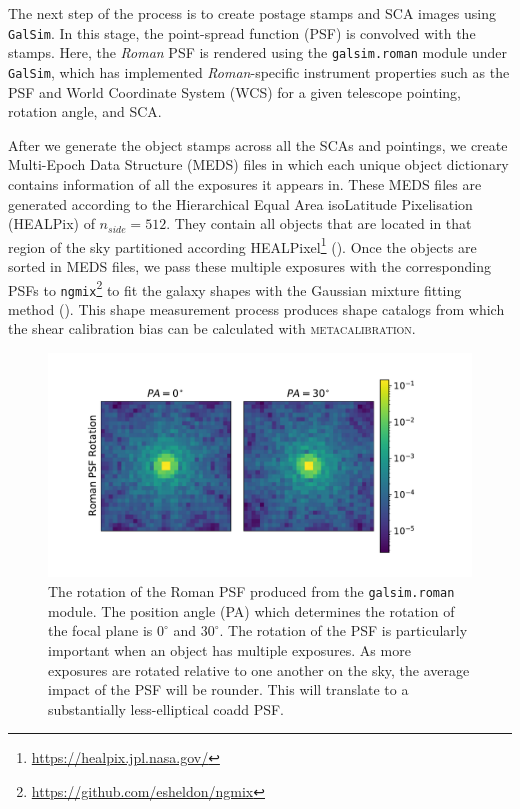 \documentclass[fleqn,usenatbib]{mnras}
\begin{document}
The next step of the process is to create postage stamps and SCA images using \texttt{GalSim}. In this stage, the point-spread function (PSF) is convolved with the stamps. Here, the \emph{Roman} PSF is rendered using the \texttt{galsim.roman} module under \texttt{GalSim}, which has implemented \emph{Roman}-specific instrument properties such as the PSF and World Coordinate System (WCS) for a given telescope pointing, rotation angle, and SCA.


After we generate the object stamps across all the SCAs and pointings, we create Multi-Epoch Data Structure (MEDS) files in which each unique object dictionary contains information of all the exposures it appears in. These MEDS files are generated according to the Hierarchical Equal Area isoLatitude Pixelisation (HEALPix) of $n_{side}=512$. They contain all objects that are located in that region of the sky partitioned according HEALPixel\footnote{\url{https://healpix.jpl.nasa.gov/}} (\citealt{2005ApJ...622..759G, Zonca2019}). Once the objects are sorted in MEDS files, we pass these multiple exposures with the corresponding PSFs to \texttt{ngmix}\footnote{\url{ https://github.com/esheldon/ngmix}} to fit the galaxy shapes with the Gaussian mixture fitting method (\citealt{2014MNRAS.444L..25S}). This shape measurement process produces shape catalogs from which the shear calibration bias can be calculated with \textsc{metacalibration}.

\begin{figure}
	\includegraphics[width=\columnwidth]{figure1.pdf}
	\vspace*{-3mm}
    \caption{The rotation of the Roman PSF produced from the \texttt{galsim.roman} module. The position angle (PA) which determines the rotation of the focal plane is $0^{\circ}$ and $30^{\circ}$. The rotation of the PSF is particularly important when an object has multiple exposures. As more exposures are rotated relative to one another on the sky, the average impact of the PSF will be rounder. This will translate to a substantially less-elliptical coadd PSF.}
    \label{fig:psfrot}
\end{figure}
\end{document}
